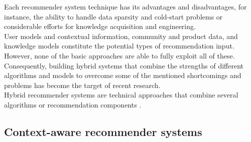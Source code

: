 Each recommender system technique has its advantages and disadvantages, 
for instance, the ability to handle data sparsity and cold-start problems
or considerable efforts for knowledge acquisition and engineering. \\
User models and contextual information, community and product data,
and knowledge models constitute the potential types of recommendation
input. However, none of the basic approaches are able to fully exploit
all of these. \\ Consequently, building hybrid systems that combine the
strengths of different algorithms and models to overcome some of the
mentioned shortcomings and problems has become the target of
recent research. \\ Hybrid recommender systems are technical approaches
that combine several algorithms or recommendation 
components \cite{jannach2010recommender}.

\subsection{Context-aware recommender systems}

